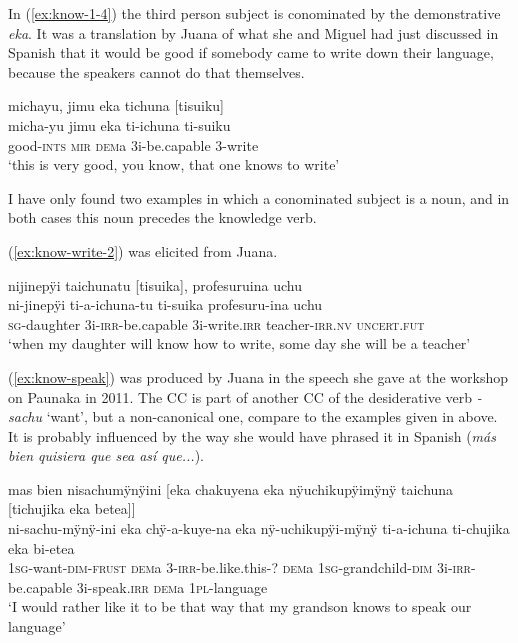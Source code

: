 In (\ref{ex:know-1-4}) the third person subject is conominated by the demonstrative \textit{eka}. It was a translation by Juana of what she and Miguel had just discussed in Spanish that it would be good if somebody came to write down their language, because the speakers cannot do that themselves.

\ea\label{ex:know-1-4}
\begingl
\glpreamble michayu, jimu eka tichuna \textup{[}tisuiku\textup{]}\\
\gla micha-yu jimu eka ti-ichuna ti-suiku\\
\glb good-\textsc{ints} \textsc{mir} \textsc{dem}a 3i-be.capable 3-write\\
\glft ‘this is very good, you know, that one knows to write’
\endgl
\trailingcitation{[jmx-e090727s.028]}
\xe

I have only found two examples in which a conominated subject is a noun, and in both cases this noun precedes the knowledge verb.

(\ref{ex:know-write-2}) was elicited from Juana.

\ea\label{ex:know-write-2}
\begingl
\glpreamble nijinepÿi taichunatu \textup{[}tisuika\textup{]}, profesuruina uchu\\
\gla ni-jinepÿi ti-a-ichuna-tu ti-suika profesuru-ina uchu\\
\textsc{sg}-daughter 3i-\textsc{irr}-be.capable 3i-write.\textsc{irr} teacher-\textsc{irr.nv} \textsc{uncert.fut}\\
\glft ‘when my daughter will know how to write, some day she will be a teacher’
\endgl
\trailingcitation{[jxx-p150920l.068]}
\xe

(\ref{ex:know-speak}) was produced by Juana in the speech she gave at the workshop on Paunaka in 2011. The CC is part of another CC of the desiderative verb \textit{-sachu} ‘want’, but a non-canonical one, compare to the examples given in  above. It is probably influenced by the way she would have phrased it in Spanish (\textit{más bien quisiera que sea así que...}).

\ea\label{ex:know-speak}
\begingl
\glpreamble mas bien nisachumÿnÿini \textup{[}eka chakuyena eka nÿuchikupÿimÿnÿ taichuna \textup{[}tichujika eka betea\textup{]}\textup{]}\\
 ni-sachu-mÿnÿ-ini eka chÿ-a-kuye-na eka nÿ-uchikupÿi-mÿnÿ ti-a-ichuna ti-chujika eka bi-etea\\
 1\textsc{sg}-want-\textsc{dim}-\textsc{frust} \textsc{dem}a 3-\textsc{irr}-be.like.this-? \textsc{dem}a 1\textsc{sg}-grandchild-\textsc{dim} 3i-\textsc{irr}-be.capable 3i-speak.\textsc{irr} \textsc{dem}a 1\textsc{pl}-language\\
\glft ‘I would rather like it to be that way that my grandson knows to speak our language’
\endgl
\trailingcitation{[jxx-x110916.24-25]}
\xe


